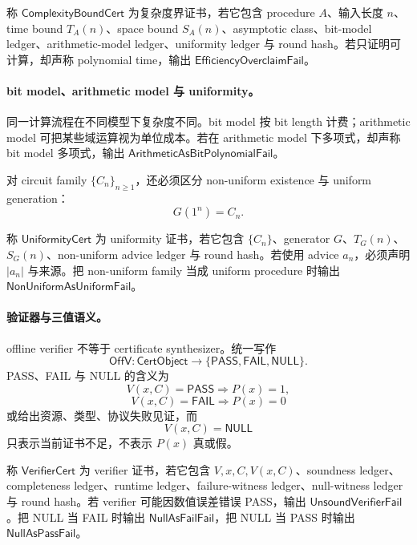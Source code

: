 \begin{definition}[复杂度界证书]\label{def:typed-address-biaxial-completion-complexity-bound-cert}
称 \(\mathsf{ComplexityBoundCert}\) 为复杂度界证书，若它包含 procedure \(A\)、输入长度 \(n\)、time bound \(T_A(n)\)、space bound \(S_A(n)\)、asymptotic class、bit-model ledger、arithmetic-model ledger、uniformity ledger 与 round hash。若只证明可计算，却声称 polynomial time，输出 \(\mathsf{EfficiencyOverclaimFail}\)。
\end{definition}

\paragraph{bit model、arithmetic model 与 uniformity。}
同一计算流程在不同模型下复杂度不同。bit model 按 bit length 计费；arithmetic model 可把某些域运算视为单位成本。若在 arithmetic model 下多项式，却声称 bit model 多项式，输出 \(\mathsf{ArithmeticAsBitPolynomialFail}\)。

对 circuit family \(\{C_n\}_{n\ge1}\)，还必须区分 non-uniform existence 与 uniform generation：
\[
\boxed{
G(1^n)=C_n.
}
\]

\begin{definition}[uniformity 证书]\label{def:typed-address-biaxial-completion-uniformity-cert}
称 \(\mathsf{UniformityCert}\) 为 uniformity 证书，若它包含 \(\{C_n\}\)、generator \(G\)、\(T_G(n)\)、\(S_G(n)\)、non-uniform advice ledger 与 round hash。若使用 advice \(a_n\)，必须声明 \(|a_n|\) 与来源。把 non-uniform family 当成 uniform procedure 时输出 \(\mathsf{NonUniformAsUniformFail}\)。
\end{definition}

\paragraph{验证器与三值语义。}
offline verifier 不等于 certificate synthesizer。统一写作
\[
\boxed{
\mathsf{OffV}:\mathsf{CertObject}
\to
\{\mathsf{PASS},\mathsf{FAIL},\mathsf{NULL}\}.
}
\]
PASS、FAIL 与 NULL 的含义为
\[
\boxed{
V(x,C)=\mathsf{PASS}\Rightarrow P(x)=1,
}
\]
\[
\boxed{
V(x,C)=\mathsf{FAIL}\Rightarrow P(x)=0
}
\]
或给出资源、类型、协议失败见证，而
\[
\boxed{
V(x,C)=\mathsf{NULL}
}
\]
只表示当前证书不足，不表示 \(P(x)\) 真或假。

\begin{definition}[verifier 证书]\label{def:typed-address-biaxial-completion-verifier-cert}
称 \(\mathsf{VerifierCert}\) 为 verifier 证书，若它包含 \(V,x,C,V(x,C)\)、soundness ledger、completeness ledger、runtime ledger、failure-witness ledger、null-witness ledger 与 round hash。若 verifier 可能因数值误差错误 PASS，输出 \(\mathsf{UnsoundVerifierFail}\)。把 NULL 当 FAIL 时输出 \(\mathsf{NullAsFailFail}\)，把 NULL 当 PASS 时输出 \(\mathsf{NullAsPassFail}\)。
\end{definition}

